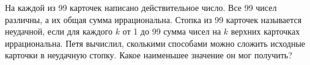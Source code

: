 \documentclass[11pt, a4paper]{template}
\begin{document}
\begin{exercise}
На каждой из 99 карточек написано действительное число. Все 99 чисел различны, а их общая сумма иррациональна. Стопка из 99 карточек называется неудачной, если для каждого $k$ от 1 до 99 сумма чисел на $k$ верхних карточках иррациональна. Петя вычислил, сколькими способами можно сложить исходные карточки в неудачную стопку. Какое наименьшее значение он мог получить?
\end{exercise}
\end{document}

